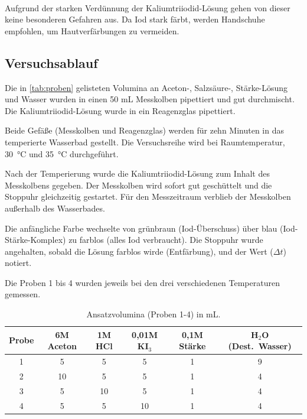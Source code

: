 \hfill
{} \\

Aufgrund der starken Verdünnung der Kaliumtriiodid-Lösung gehen von dieser keine besonderen Gefahren aus.
Da Iod stark färbt, werden Handschuhe empfohlen, um Hautverfärbungen zu vermeiden.


\subsection{Versuchsablauf}
Die in \autoref{tab:proben} gelisteten Volumina an Aceton-, Salzsäure-, Stärke-Lösung und Wasser wurden in einen 50 mL Messkolben pipettiert und gut durchmischt. 
Die Kaliumtriiodid-Lösung wurde in ein Reagenzglas pipettiert.

Beide Gefäße (Messkolben und Reagenzglas) werden für zehn Minuten in das temperierte Wasserbad gestellt.
Die Versuchsreihe wird bei Raumtemperatur, \qty{30}{\degreeCelsius} und \qty{35}{\degreeCelsius} durchgeführt.

Nach der Temperierung wurde die Kaliumtriiodid-Lösung zum Inhalt des Messkolbens gegeben.
Der Messkolben wird sofort gut geschüttelt und die Stoppuhr gleichzeitig gestartet.
Für den Messzeitraum verblieb der Messkolben außerhalb des Wasserbades.

Die anfängliche Farbe wechselte von grünbraun (Iod-Überschuss) über blau (Iod-Stärke-Komplex) zu farblos (alles Iod verbraucht).
Die Stoppuhr wurde angehalten, sobald die Lösung farblos wirde (Entfärbung), und der Wert ($\Delta t$) notiert.

Die Proben 1 bis 4 wurden jeweils bei den drei verschiedenen Temperaturen gemessen.
\begin{table}[H]
    \centering
    \caption{Ansatzvolumina (Proben 1-4) in \unit{\milli\liter}.}
    \begin{tabular}{c c c c c c}
        \toprule
        Probe & 6M Aceton & 1M HCl & 0{,}01M KI$_3$ & 0{,}1M Stärke & H$_2$O (Dest.\ Wasser) \\ \midrule
        1 &  5 &  5 &  5 &  1 &  9 \\ \midrule
        2 & 10 &  5 &  5 &  1 &  4 \\ \midrule
        3 &  5 & 10 &  5 &  1 &  4 \\ \midrule
        4 &  5 &  5 & 10 &  1 &  4 \\
        \bottomrule
    \end{tabular}
    \label{tab:proben}
\end{table}

